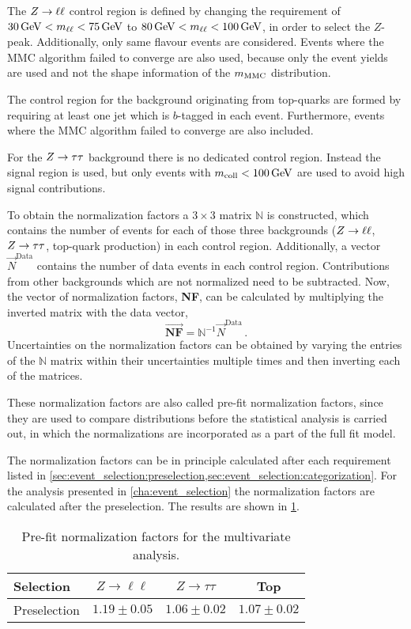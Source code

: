 The $Z \to \ell \ell$ control region is defined by changing the requirement of $\SI{30}{\GeV} < \mll < \SI{75}{\GeV}$ to $\SI{80}{\GeV} < \mll < \SI{100}{\GeV}$, in order to
select the $Z$-peak. Additionally, only same flavour events are considered.
Events where the MMC algorithm failed to converge are also used, because only the event yields are used and not the shape information
of the $m_\text{MMC}$ distribution.

The control region for the background originating from top-quarks are formed by requiring at least one jet which is $b$-tagged in each event.
Furthermore, events where the MMC algorithm failed to converge are also included.

For the $Z \to \tau \tau$ background there is no dedicated control region.
Instead the signal region is used, but only events with $\mcoll < \SI{100}{\GeV}$ are used to avoid high signal contributions.

To obtain the normalization factors a $3 \times 3$ matrix $\mathbb{N}$ is constructed, which contains the number of events for each of those three backgrounds
($Z \to \ell \ell$, $Z \to \tau \tau$, top-quark production)
in each control region.
Additionally, a vector $\vec{N}^\text{Data}$ contains the number of data events in each control region.
Contributions from other backgrounds which are not normalized need to be subtracted.
Now, the vector of normalization factors, \textbf{NF}, can be calculated by multiplying the inverted matrix with the data vector,
\begin{equation}
    \vec{\textbf{NF}} = \mathbb{N}^{-1} \vec{N}^\text{Data} \,.
\end{equation}
Uncertainties on the normalization factors can be obtained by varying the entries of the $\mathbb{N}$ matrix within their uncertainties multiple times and then
inverting each of the matrices.

These normalization factors are also called pre-fit normalization factors, since they are used to compare distributions
before the statistical analysis is carried out, in which the normalizations are incorporated as a part of the full fit model.


The normalization factors can be in principle calculated after each requirement listed in \cref{sec:event_selection:preselection,sec:event_selection:categorization}.
For the analysis presented in \cref{cha:event_selection} the normalization factors are calculated after the preselection.
The results are shown in \cref{tab:background_estimation:nfs}.

\begin{table}[htpb]
    \centering
    \caption{Pre-fit normalization factors for the multivariate analysis.}\label{tab:background_estimation:nfs}
    \begin{tabular}{lccc}
        \toprule
        Selection        & $Z \to \ell\ell$ & $Z \to \tau\tau$ & Top \\ \midrule
        Preselection    & $1.19 \pm 0.05$ & $1.06 \pm 0.02$ & $1.07 \pm 0.02$ \\
        \bottomrule
    \end{tabular}
\end{table}

